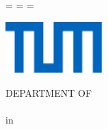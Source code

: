 \begin{titlepage}
  \oddsidemargin=\evensidemargin\relax
  \textwidth=\dimexpr{}\evensidemargin-2in\relax
  \hsize=\textwidth\relax

  \centering

  \includegraphics[height=20mm]{logos/tum.pdf}

  \vspace{5mm}
  {\huge\MakeUppercase{Department of \getFaculty{}}}\\

  \vspace{5mm}
  {\large\MakeUppercase{\getUniversity{}}}\\

  \vspace{20mm}
  {\Large \getDoctype{} in \getStudies{}}

  \vspace{15mm}
  {\huge\bfseries \getTitle{}}

  \vspace{15mm}
  {\LARGE \getAuthor{}}

\end{titlepage}

